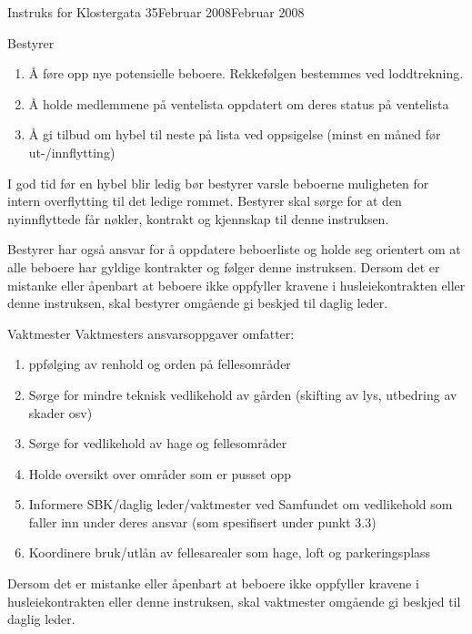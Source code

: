 \begin{instruks}{Instruks for Klostergata 35}{Februar 2008}{Februar 2008}
\begin{instruksledd}{Bestyrer}
        \begin{enumerate}
            \item Å føre opp nye potensielle beboere. Rekkefølgen bestemmes ved loddtrekning.
            \item Å holde medlemmene på ventelista oppdatert om deres status på ventelista
            \item Å gi tilbud om hybel til neste på lista ved oppsigelse (minst en måned før
                ut-/innflytting)
        \end{enumerate}

        I god tid før en hybel blir ledig bør bestyrer varsle beboerne muligheten for
        intern overflytting til det ledige rommet.
        Bestyrer skal sørge for at den nyinnflyttede får nøkler, kontrakt og kjennskap til
        denne instruksen.

        Bestyrer har også ansvar for å oppdatere beboerliste og holde seg orientert om at
        alle beboere har gyldige kontrakter
        og følger denne instruksen. Dersom det er mistanke eller åpenbart at beboere ikke
        oppfyller kravene i
        husleiekontrakten eller denne instruksen, skal bestyrer omgående gi beskjed til
        daglig leder.

    \end{instruksledd}

    \begin{instruksledd}{Vaktmester}
        Vaktmesters ansvarsoppgaver omfatter:
        \begin{enumerate}
            \item ppfølging av renhold og orden på fellesområder
            \item Sørge for mindre teknisk vedlikehold av gården (skifting av lys,
                utbedring av skader osv)
            \item Sørge for vedlikehold av hage og fellesområder
            \item Holde oversikt over områder som er pusset opp
            \item Informere SBK/daglig leder/vaktmester ved Samfundet om vedlikehold som
                faller inn under deres ansvar
                (som spesifisert under punkt 3.3)
            \item Koordinere bruk/utlån av fellesarealer som hage, loft og
                parkeringsplass
        \end{enumerate}
        Dersom det er mistanke eller åpenbart at beboere ikke oppfyller kravene i
        husleiekontrakten eller denne instruksen,
        skal vaktmester omgående gi beskjed til daglig leder.
    \end{instruksledd}


\end{instruks}
